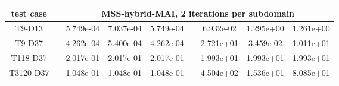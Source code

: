 \begin{table}
\begin{adjustbox}{width=1\textwidth} %
\small
\begin{tabular}{ccccccccc}
\toprule
{test case} && \multicolumn{7}{c}{MSS-hybrid-MAI, 2 iterations per subdomain}   \\
\midrule
T9-D13       &&  5.749e-04 &  7.037e-04 &  5.749e-04 &&  6.932e-02 &  1.295e+00 &  1.261e+00 \\
T9-D37       &&  4.262e-04 &  5.400e-04 &  4.262e-04 &&  2.721e+01 &  3.459e-02 &  1.011e+01 \\
T118-D37     &&  2.017e-01 &  2.017e-01 &  2.017e-01 &&  1.993e+01 &  1.993e+01 &  1.993e+01 \\
T3120-D37    &&  1.048e-01 &  1.048e-01 &  1.048e-01 &&  4.504e+02 &  1.536e+01 &  8.085e+01 \\
\bottomrule
\end{tabular}
\end{adjustbox}
\end{table}